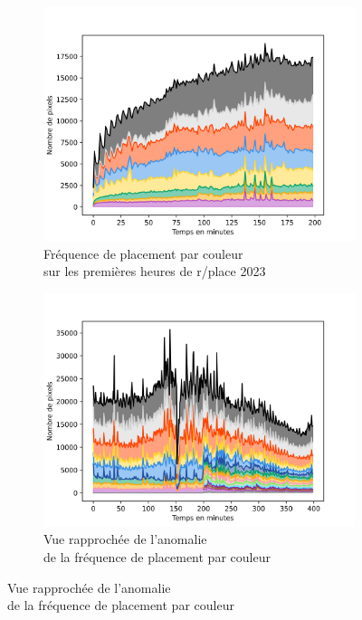 \documentclass[a4paper]{article}
\begin{document}
{\begin{figure}[h]
    \captionsetup[subfigure]{justification=centering}
    \begin{subfigure}{.5\linewidth}
        \includegraphics[width=\linewidth]{pixel_placement_frequency_by_color_debut.png}
        \caption{Fréquence de placement par couleur \\ sur les premières heures de r/place 2023}
        \label{fig:pixel_placement_frequency_by_color_debut}
    \end{subfigure}
    \begin{subfigure}{.5\linewidth}
        \includegraphics[width=\linewidth]{pixel_placement_frequency_by_color_anomalie.png}
        \caption{Vue rapprochée de l'anomalie \\ de la fréquence de placement par couleur}
        \label{fig:pixel_placement_frequency_by_color_anomalie}
    \end{subfigure}
\end{figure}

}
\end{document}
